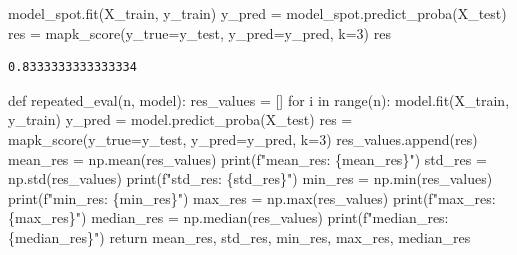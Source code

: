 \documentclass[
  letterpaper,
  DIV=11,
  numbers=noendperiod]{scrreprt}
\newenvironment{Shaded}{\begin{snugshade}}{\end{snugshade}}
\newcommand{\BuiltInTok}[1]{\textcolor[rgb]{0.00,0.23,0.31}{#1}}
\newcommand{\ControlFlowTok}[1]{\textcolor[rgb]{0.00,0.23,0.31}{#1}}
\newcommand{\DecValTok}[1]{\textcolor[rgb]{0.68,0.00,0.00}{#1}}
\newcommand{\KeywordTok}[1]{\textcolor[rgb]{0.00,0.23,0.31}{#1}}
\newcommand{\NormalTok}[1]{\textcolor[rgb]{0.00,0.23,0.31}{#1}}
\newcommand{\OperatorTok}[1]{\textcolor[rgb]{0.37,0.37,0.37}{#1}}
\newcommand{\SpecialCharTok}[1]{\textcolor[rgb]{0.37,0.37,0.37}{#1}}
\newcommand{\SpecialStringTok}[1]{\textcolor[rgb]{0.13,0.47,0.30}{#1}}
\begin{document}
\begin{Shaded}
\begin{Highlighting}[]
\NormalTok{model\_spot.fit(X\_train, y\_train)}
\NormalTok{y\_pred }\OperatorTok{=}\NormalTok{ model\_spot.predict\_proba(X\_test)}
\NormalTok{res }\OperatorTok{=}\NormalTok{ mapk\_score(y\_true}\OperatorTok{=}\NormalTok{y\_test, y\_pred}\OperatorTok{=}\NormalTok{y\_pred, k}\OperatorTok{=}\DecValTok{3}\NormalTok{)}
\NormalTok{res}
\end{Highlighting}
\end{Shaded}

\begin{verbatim}
0.8333333333333334
\end{verbatim}

\begin{Shaded}
\begin{Highlighting}[]
\KeywordTok{def}\NormalTok{ repeated\_eval(n, model):}
\NormalTok{    res\_values }\OperatorTok{=}\NormalTok{ []}
    \ControlFlowTok{for}\NormalTok{ i }\KeywordTok{in} \BuiltInTok{range}\NormalTok{(n):}
\NormalTok{        model.fit(X\_train, y\_train)}
\NormalTok{        y\_pred }\OperatorTok{=}\NormalTok{ model.predict\_proba(X\_test)}
\NormalTok{        res }\OperatorTok{=}\NormalTok{ mapk\_score(y\_true}\OperatorTok{=}\NormalTok{y\_test, y\_pred}\OperatorTok{=}\NormalTok{y\_pred, k}\OperatorTok{=}\DecValTok{3}\NormalTok{)}
\NormalTok{        res\_values.append(res)}
\NormalTok{    mean\_res }\OperatorTok{=}\NormalTok{ np.mean(res\_values)}
    \BuiltInTok{print}\NormalTok{(}\SpecialStringTok{f"mean\_res: }\SpecialCharTok{\{}\NormalTok{mean\_res}\SpecialCharTok{\}}\SpecialStringTok{"}\NormalTok{)}
\NormalTok{    std\_res }\OperatorTok{=}\NormalTok{ np.std(res\_values)}
    \BuiltInTok{print}\NormalTok{(}\SpecialStringTok{f"std\_res: }\SpecialCharTok{\{}\NormalTok{std\_res}\SpecialCharTok{\}}\SpecialStringTok{"}\NormalTok{)}
\NormalTok{    min\_res }\OperatorTok{=}\NormalTok{ np.}\BuiltInTok{min}\NormalTok{(res\_values)}
    \BuiltInTok{print}\NormalTok{(}\SpecialStringTok{f"min\_res: }\SpecialCharTok{\{}\NormalTok{min\_res}\SpecialCharTok{\}}\SpecialStringTok{"}\NormalTok{)}
\NormalTok{    max\_res }\OperatorTok{=}\NormalTok{ np.}\BuiltInTok{max}\NormalTok{(res\_values)}
    \BuiltInTok{print}\NormalTok{(}\SpecialStringTok{f"max\_res: }\SpecialCharTok{\{}\NormalTok{max\_res}\SpecialCharTok{\}}\SpecialStringTok{"}\NormalTok{)}
\NormalTok{    median\_res }\OperatorTok{=}\NormalTok{ np.median(res\_values)}
    \BuiltInTok{print}\NormalTok{(}\SpecialStringTok{f"median\_res: }\SpecialCharTok{\{}\NormalTok{median\_res}\SpecialCharTok{\}}\SpecialStringTok{"}\NormalTok{)}
    \ControlFlowTok{return}\NormalTok{ mean\_res, std\_res, min\_res, max\_res, median\_res}
\end{Highlighting}
\end{Shaded}
\end{document}
